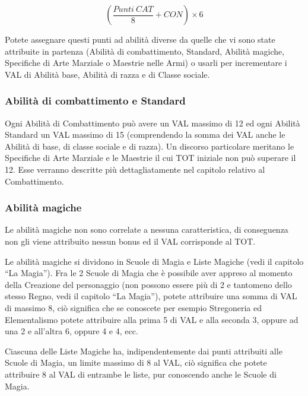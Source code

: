 $$(\frac{Punti\ CAT}{8} + CON) \times 6$$

Potete assegnare questi punti ad abilit\`a diverse da quelle che vi
sono state attribuite in partenza (Abilit\`a di combattimento,
Standard, Abilit\`a magiche, Specifiche di Arte Marziale o Maestrie
nelle Armi) o usarli per incrementare i VAL di Abilit\`a base,
Abilit\`a di razza e di Classe sociale.


\bigskip
{}

\subsubsection{Abilit\`a di combattimento e Standard}

Ogni Abilit\`a di Combattimento pu\`o avere un VAL massimo di 12
ed ogni Abilit\`a Standard un VAL massimo di 15 (comprendendo la
somma dei VAL anche le Abilit\`a di base, di classe sociale e di
razza).  Un discorso particolare meritano le Specifiche di Arte
Marziale e le Maestrie il cui TOT iniziale non pu\`o superare il 12.
Esse verranno descritte pi\`u dettagliatamente nel capitolo relativo
al Combattimento.

\subsubsection{Abilit\`a magiche}

Le abilit\`a magiche non sono correlate a nessuna caratteristica, di
conseguenza non gli viene attribuito nessun bonus ed il VAL
corrisponde al TOT.

Le abilit\`a magiche si dividono in Scuole di Magia e Liste Magiche
(vedi il capitolo ``La Magia''). Fra le 2 Scuole di Magia che \`e
possibile aver appreso al momento della Creazione del personaggio (non
possono essere pi\`u di 2 e tantomeno dello stesso Regno, vedi il
capitolo ``La Magia''), potete attribuire una somma di VAL di massimo
8, ci\`o significa che se conoscete per esempio Stregoneria ed
Elementalismo potete attribuire alla prima 5 di VAL e alla seconda 3,
oppure ad una 2 e all'altra 6, oppure 4 e 4, ecc.

Ciascuna delle Liste Magiche ha, indipendentemente dai punti
attribuiti alle Scuole di Magia, un limite massimo di 8 al VAL,
ci\`o significa che potete attribuire 8 al VAL di entrambe le liste,
pur conoscendo anche le Scuole di Magia.


